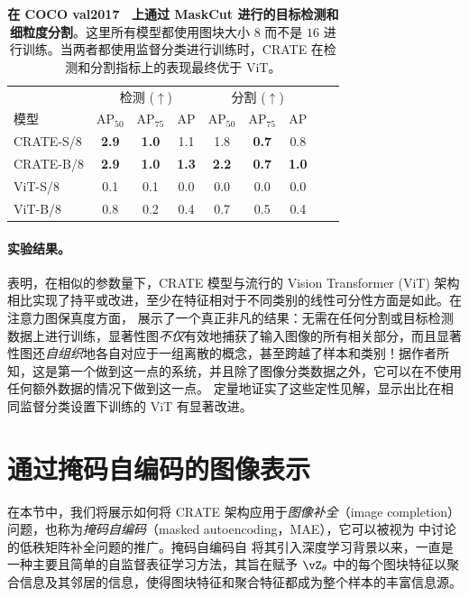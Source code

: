 \documentclass[../../book-main_zh.tex]{subfiles}
\begin{document}
\begin{table}
\caption{\small \textbf{在 COCO {val2017}~\citep{lin2014microsoft} 上通过 MaskCut 进行的目标检测和细粒度分割}。这里所有模型都使用图块大小 \(8\) 而不是 \(16\) 进行训练。当两者都使用监督分类进行训练时，CRATE 在检测和分割指标上的表现最终优于 ViT。}
\centering
\begin{tabular}{@{}lcccccccc@{}}
    \toprule
    &  \multicolumn{3}{c}{检测 (\(\uparrow\))} &
    \multicolumn{3}{c}{分割 (\(\uparrow\))} \\
    模型 & AP$_{50}$ & AP$_{75}$ & AP & AP$_{50}$ & AP$_{75}$ & AP  \\
    \midrule
    CRATE-S/8 & \textbf{2.9} & \textbf{1.0} & 1.1 & 1.8 & \textbf{0.7} & 0.8 \\
    CRATE-B/8 & \textbf{2.9} & \textbf{1.0} & \textbf{1.3} &
    \textbf{2.2} & \textbf{0.7} & \textbf{1.0} \\
    ViT-S/8 & 0.1& 0.1 & 0.0 & 0.0 & 0.0 & 0.0 \\
    ViT-B/8 & 0.8 & 0.2 & 0.4 & 0.7 & 0.5 & 0.4 \\
    \bottomrule
\end{tabular}
\label{tab:crate_detection_segmentation}
\end{table}

\paragraph{实验结果。}

 表明，在相似的参数量下，CRATE 模型与流行的 Vision Transformer (ViT) 架构相比实现了持平或改进，至少在特征相对于不同类别的线性可分性方面是如此。在注意力图保真度方面， 展示了一个真正非凡的结果：无需在任何分割或目标检测数据上进行训练，显著性图\textit{不仅}有效地捕获了输入图像的所有相关部分，而且显著性图还\textit{自组织}地各自对应于一组离散的概念，甚至跨越了样本和类别！据作者所知，这是第一个做到这一点的系统，并且除了图像分类数据之外，它可以在不使用任何额外数据的情况下做到这一点。 定量地证实了这些定性见解，显示出比在相同监督分类设置下训练的 ViT 有显著改进。

\section{通过掩码自编码的图像表示}\label{sec:image_completion}

在本节中，我们将展示如何将 CRATE 架构应用于\textit{图像补全}（image completion）问题，也称为\textit{掩码自编码}（masked autoencoding，MAE），它可以被视为  中讨论的低秩矩阵补全问题的推广。掩码自编码自 \cite{he2022masked} 将其引入深度学习背景以来，一直是一种主要且简单的自监督表征学习方法，其旨在赋予 \(\vZ_{\theta}\) 中的每个图块特征以聚合信息及其邻居的信息，使得图块特征和聚合特征都成为整个样本的丰富信息源。
\end{document}
